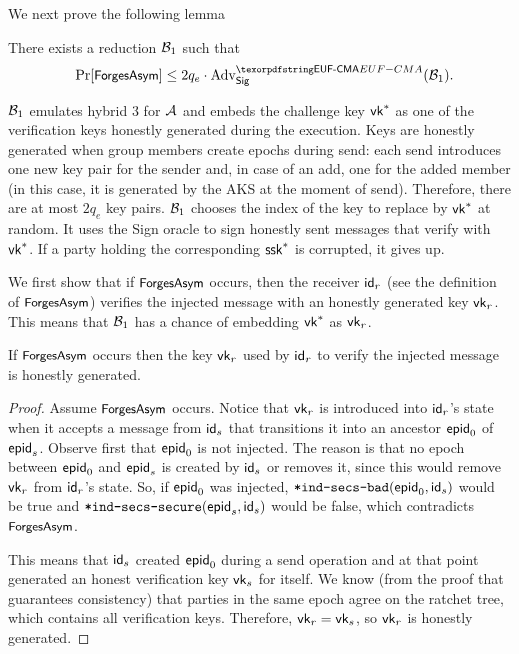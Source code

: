 We next prove the following lemma
\begin{lemma}
There exists a reduction $\Bdv[1]$ such that
\begin{equation*}
    \Pr[\forgesa] \leq 2q_e\cdot \textnormal{Adv}^{\ufcma}_\sigscheme(\Bdv[1]).
\end{equation*}
\end{lemma}
$\Bdv[1]$ emulates hybrid 3 for $\Adv$ and embeds the challenge key $\ersvk^*$ as one of the verification keys honestly generated during the execution. Keys are honestly generated when group members create epochs during send: each send introduces one new key pair for the sender and, in case of an add, one for the added member (in this case, it is generated by the AKS at the moment of send). Therefore, there are at most $2q_e$ key pairs.
$\Bdv[1]$ chooses the index of the key to replace by $\ersvk^*$ at random. It uses the Sign oracle to sign honestly sent messages that verify with $\ersvk^*$. If a party holding the corresponding $\ssk^*$ is corrupted, it gives up.

We first show that if $\forgesa$ occurs, then the receiver $\id_r$ (see the definition of $\forgesa$) verifies the injected message with an honestly generated key $\ersvk_r$. This means that $\Bdv[1]$ has a chance of embedding $\ersvk^*$ as $\ersvk_r$.
\begin{claim}
  If $\forgesa$ occurs then the key $\ersvk_r$ used by $\id_r$ to verify the injected message is honestly generated.
\end{claim}
\begin{proof}
  Assume $\forgesa$ occurs.
  Notice that $\ersvk_r$ is introduced into $\id_r$'s state when it accepts a message from $\id_s$ that transitions it into an ancestor $\hgnodeid_0$ of $\hgnodeid_s$.
  Observe first that $\hgnodeid_0$ is not injected. The reason is that no epoch between $\hgnodeid_0$ and $\hgnodeid_s$ is created by $\id_s$ or removes it, since this would remove $\ersvk_r$ from $\id_r$'s state. So, if $\hgnodeid_0$ was injected, $\safeKnowsSecrets(\hgnodeid_0, \id_s)$ would be true and $\safeIndSecsSecure(\hgnodeid_s, \id_s)$ would be false, which contradicts $\forgesa$.

  This means that $\id_s$ created $\hgnodeid_0$ during a send operation and at that point generated an honest verification key $\ersvk_s$ for itself. We know (from the proof that \saik guarantees consistency) that parties in the same epoch agree on the ratchet tree, which contains all verification keys. Therefore, $\ersvk_r=\ersvk_s$, so $\ersvk_r$ is honestly generated.
\end{proof}

